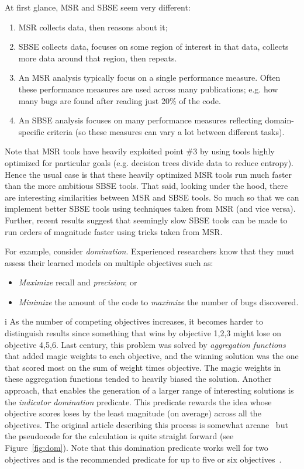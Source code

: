 \documentclass[table, xcdraw, sigconf,review, anonymous]{acmart}
\begin{document}
At first glance, MSR and SBSE seem very different:
\begin{enumerate}
\item MSR collects data, then reasons about it;
\item SBSE  collects data,
focuses on some region of interest in that data,  collects more data around that region, then repeats.
\item An MSR analysis typically focus on a single performance measure.
Often these performance measures are used across many publications; e.g.  how many bugs are found after reading just 20\% of the code.
\item An SBSE analysis focuses on many performance measures reflecting domain-specific criteria (so these measures
can  vary a lot between different tasks).
\end{enumerate}
Note that
MSR tools have heavily exploited point \#3 by using tools highly optimized for particular goals (e.g. decision
trees divide data to reduce entropy). Hence the usual case is that
 these heavily optimized MSR tools run much faster than the more ambitious SBSE tools.
That said, looking under the hood, there are interesting similarities between MSR and SBSE tools.
So much so that we can implement better SBSE tools using techniques taken from MSR (and vice versa).
Further, recent results suggest that seemingly slow SBSE tools can be made to run orders of magnitude faster
using tricks taken from MSR.

For example, consider {\em domination}. Experienced  researchers know that they
must assess their learned models on multiple objectives such as:
\begin{itemize}
\item
{\em Maximize} recall  and {\em  precision}; or
\item
{\em Minimize} the  amount of the code to {\em maximize} the number of bugs discovered.
\end{itemize}i
As the number of competing objectives increases, it becomes harder to distinguish results since something
that wins by objective 1,2,3 might lose on objective 4,5,6. Last century, this problem was solved by
{\em aggregation functions} that added magic weights to each objective, and the winning solution
was the one that scored most on the sum of weight times objective. The magic weights in these aggregation functions tended
to heavily biased
the solution. Another approach, that enables the generation of  a larger range of interesting
solutions is the {\em indicator domination} predicate. This predicate 
rewards the idea whose objective
scores loses by the least magnitude (on average) across all the objectives. The original
article   describing this process is
somewhat  
arcane~\cite{zitzler2001spea2} but the pseudocode for  the calculation is quite straight forward (see Figure~\ref{fig:dom}). Note that this
domination predicate works well for two objectives and is the recommended predicate for up to five or six objectives~\cite{sayyad13a}.
\end{document}
